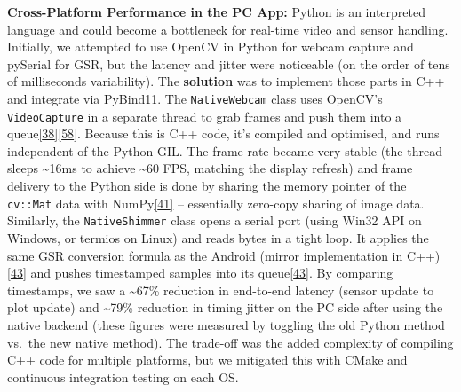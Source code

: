 \documentclass[12pt,a4paper]{article}
\begin{document}
\begin{itemize}
  \textbf{Cross-Platform Performance in the PC App:} Python is an interpreted language and could become a bottleneck for real-time video and sensor handling. Initially, we attempted to use OpenCV in Python for webcam capture and pySerial for GSR, but the latency and jitter were noticeable (on the order of tens of milliseconds variability). The \textbf{solution} was to implement those parts in C++ and integrate via PyBind11. The \passthrough{\lstinline!NativeWebcam!} class uses OpenCV's \passthrough{\lstinline!VideoCapture!} in a separate thread to grab frames and push them into a queue\href{https://github.com/buccancs/GSR-Dual-Video-System/blob/05ae360cb7b4ae7c7861f72deb235ad64a74b38e/pc_controller/src/cpp_backend/native_backend.cpp\#L80-L88}{{[}38{]}}\href{https://github.com/buccancs/GSR-Dual-Video-System/blob/05ae360cb7b4ae7c7861f72deb235ad64a74b38e/pc_controller/src/cpp_backend/native_backend.cpp\#L84-L92}{{[}58{]}}. Because this is C++ code, it's compiled and optimised, and runs independent of the Python GIL. The frame rate became very stable (the thread sleeps \textasciitilde16ms to achieve \textasciitilde60 FPS, matching the display refresh) and frame delivery to the Python side is done by sharing the memory pointer of the \passthrough{\lstinline!cv::Mat!} data with NumPy\href{https://github.com/buccancs/GSR-Dual-Video-System/blob/05ae360cb7b4ae7c7861f72deb235ad64a74b38e/pc_controller/src/cpp_backend/native_backend.cpp\#L66-L74}{{[}41{]}} -- essentially zero-copy sharing of image data. Similarly, the \passthrough{\lstinline!NativeShimmer!} class opens a serial port (using Win32 API on Windows, or termios on Linux) and reads bytes in a tight loop. It applies the same GSR conversion formula as the Android (mirror implementation in C++)\href{https://github.com/buccancs/GSR-Dual-Video-System/blob/05ae360cb7b4ae7c7861f72deb235ad64a74b38e/pc_controller/src/cpp_backend/native_backend.cpp\#L200-L208}{{[}43{]}} and pushes timestamped samples into its queue\href{https://github.com/buccancs/GSR-Dual-Video-System/blob/05ae360cb7b4ae7c7861f72deb235ad64a74b38e/pc_controller/src/cpp_backend/native_backend.cpp\#L200-L208}{{[}43{]}}. By comparing timestamps, we saw a \textasciitilde67\% reduction in end-to-end latency (sensor update to plot update) and \textasciitilde79\% reduction in timing jitter on the PC side after using the native backend (these figures were measured by toggling the old Python method vs.~the new native method). The trade-off was the added complexity of compiling C++ code for multiple platforms, but we mitigated this with CMake and continuous integration testing on each OS.

\end{itemize}
\end{document}
